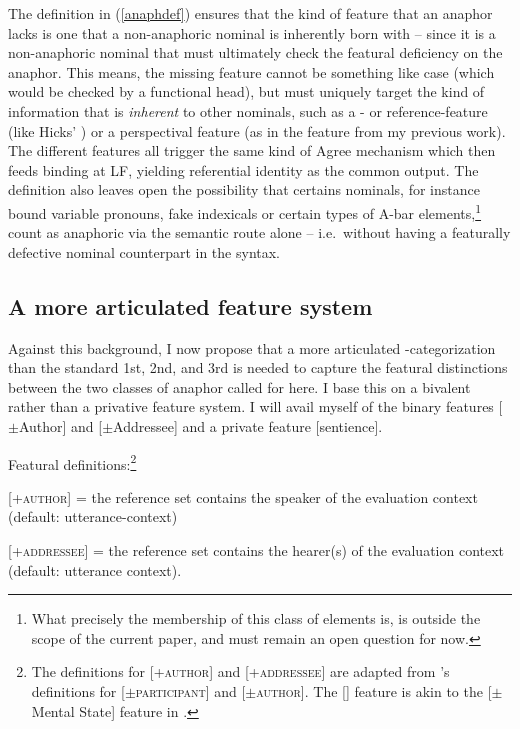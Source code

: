 \documentclass[output=paper, modfonts, nonflat]{langsci/langscibook}
\begin{document}
\noindent The definition in (\ref{anaphdef}) ensures that the kind of feature that an anaphor
lacks is one that a non-anaphoric nominal is inherently born with --
since it is a non-anaphoric nominal that must ultimately check the
featural deficiency on the anaphor. This means, the missing feature
cannot be something like case (which would be checked by a functional
head), but must uniquely target the kind of information that is
\emph{inherent} to other nominals, such as a \ph- or reference-feature
(like Hicks' \var) or a perspectival feature (as in the \dep{} feature
from my previous work). The different features all trigger the same
kind of Agree mechanism which then feeds binding at LF, yielding
referential identity as the common output. The definition also leaves
open the possibility that certains nominals, for instance bound
variable pronouns, fake indexicals \citep{kratzer:2009} or certain
types of A-bar elements,\footnote{What precisely the membership of
  this class of elements is, is outside the scope of the current
  paper, and must remain an open question for now.}  count as
anaphoric via the semantic route alone -- i.e.\ without having a
featurally defective nominal counterpart in the syntax.


\subsection{A more articulated feature system}

Against this background, I now propose that a more articulated
\person-cat\-e\-go\-rization than the standard 1st, 2nd, and 3rd is needed
to capture the featural distinctions between the two classes of
anaphor called for here. I base this on a bivalent rather than a
privative feature system. I will avail myself of the binary features
[$\pm$Author] and [$\pm$Addressee] and a private feature
[sentience].

\ea\label{def} Featural definitions:\footnote{The definitions
  for \textsc{[+author]} and \textsc{[+addressee]} are adapted from
  \citet{halle:1997, nevins:2007}'s definitions for
  [$\pm$\textsc{participant}] and [$\pm$\textsc{author}]. The [\sentience] feature is
  akin to the [$\pm$ Mental State] feature in \citet{reinhart:2000}.}

\ea \textsc{[+author]} = the reference set contains the speaker of the
evaluation context (default: utterance-context)

\ex \textsc{[+addressee]} = the reference set contains the hearer(s)
of the evaluation context (default: utterance context).
\end{document}
